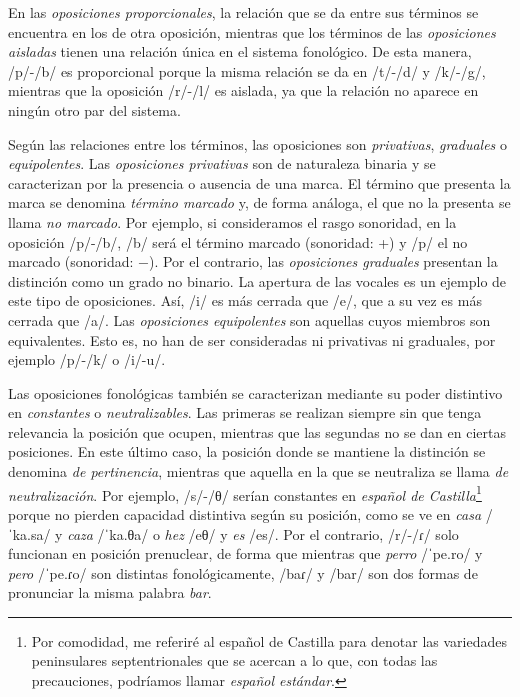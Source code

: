 En las \textit{oposiciones proporcionales}, la relación que se da entre sus términos se encuentra en los de otra oposición, mientras que los términos de las \textit{oposiciones aisladas} tienen una relación única en el sistema fonológico. De esta manera, /p/-/b/ es proporcional porque la misma relación se da en /t/-/d/ y /k/-/g/, mientras que la oposición /r/-/l/ es aislada, ya que la relación no aparece en ningún otro par del sistema. 

Según las relaciones entre los términos, las oposiciones son \textit{privativas}, \textit{graduales} o \textit{equipolentes}. Las \textit{oposiciones privativas} son de naturaleza binaria y se caracterizan por la presencia o ausencia de una marca. El término que presenta la marca se denomina \textit{término marcado} y, de forma análoga, el que no la presenta se llama \textit{no marcado}. Por ejemplo, si consideramos el rasgo sonoridad, en la oposición /p/-/b/, /b/ será el término marcado (sonoridad: +) y /p/ el no marcado (sonoridad: $-$). Por el contrario, las \textit{oposiciones graduales} presentan la distinción como un grado no binario. La apertura de las vocales es un ejemplo de este tipo de oposiciones. Así, /i/ es más cerrada que /e/, que a su vez es más cerrada que /a/. Las \textit{oposiciones equipolentes} son aquellas cuyos miembros son equivalentes. Esto es, no han de ser consideradas ni privativas ni graduales, por ejemplo /p/-/k/ o /i/-u/.

Las oposiciones fonológicas también se caracterizan mediante su poder distintivo en \textit{constantes} o \textit{neutralizables}. Las primeras se realizan siempre sin que tenga relevancia la posición que ocupen, mientras que las segundas no se dan en ciertas posiciones. En este último caso, la posición donde se mantiene la distinción se denomina \textit{de pertinencia}, mientras que aquella en la que se neutraliza se llama \textit{de neutralización}. Por ejemplo, /s/-/θ/ serían constantes en \textit{español de Castilla}\footnote{Por comodidad, me referiré al español de Castilla para denotar las variedades peninsulares septentrionales que se acercan a lo que, con todas las precauciones, podríamos llamar \textit{español estándar}.} porque no pierden capacidad distintiva según su posición, como se ve en \textit{casa} /ˈka.sa/ y \textit{caza} /ˈka.θa/ o \textit{hez} /eθ/ y \textit{es} /es/. Por el contrario, /r/-/ɾ/ solo funcionan en posición prenuclear, de forma que mientras que \textit{perro} /ˈpe.ro/ y \textit{pero} /ˈpe.ɾo/ son distintas fonológicamente,  /baɾ/ y /bar/ son dos formas de pronunciar la misma palabra \textit{bar}.


